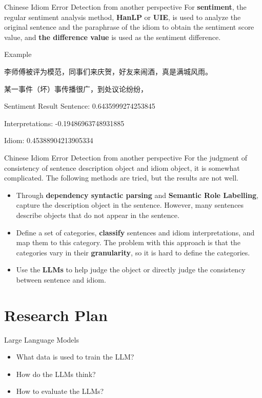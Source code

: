 \documentclass[10pt]{beamer}
\begin{document}
\begin{frame}{Chinese Idiom Error Detection from another perspective}
For \textbf{sentiment}, the regular sentiment analysis method, \textbf{HanLP}\cite{HanLP} or \textbf{UIE}\cite{UIE}, is used to analyze the original sentence and the paraphrase of the idiom to obtain the sentiment score value, and \textbf{the difference value} is used as the sentiment difference. 
\begin{exampleblock}{Example}
\begin{CJK}{UTF8}{gbsn}
李师傅被评为模范，同事们来庆贺，好友来闹酒，真是满城风雨。

某一事件（坏）事传播很广，到处议论纷纷，
\end{CJK}
\end{exampleblock}
\begin{alertblock}{Sentiment Result}
Sentence: 0.6435999274253845

Interpretations: -0.19486963748931885

Idiom: 0.45388904213905334
\end{alertblock}
\end{frame}

\begin{frame}{Chinese Idiom Error Detection from another perspective}
For the judgment of consistency of sentence description object and idiom object, it is somewhat complicated. The following methods are tried, but the results are not well.
\begin{itemize}
    \item Through \textbf{dependency syntactic parsing} and \textbf{Semantic Role Labelling}, capture the description object in the sentence. However, many sentences describe objects that do not appear in the sentence.
    \item Define a set of categories, \textbf{classify} sentences and idiom interpretations, and map them to this category. The problem with this approach is that the categories vary in their \textbf{granularity}, so it is hard to define the categories.
    \item Use the \textbf{LLMs} to help judge the object or directly judge the consistency between sentence and idiom.
\end{itemize}
\end{frame}

\section{Research Plan}
\begin{frame}{Large Language Models}
\begin{itemize}
    \item What data is used to train the LLM?
    \item How do the LLMs think?
    \item How to evaluate the LLMs?
\end{itemize}
\end{frame}
\end{document}
